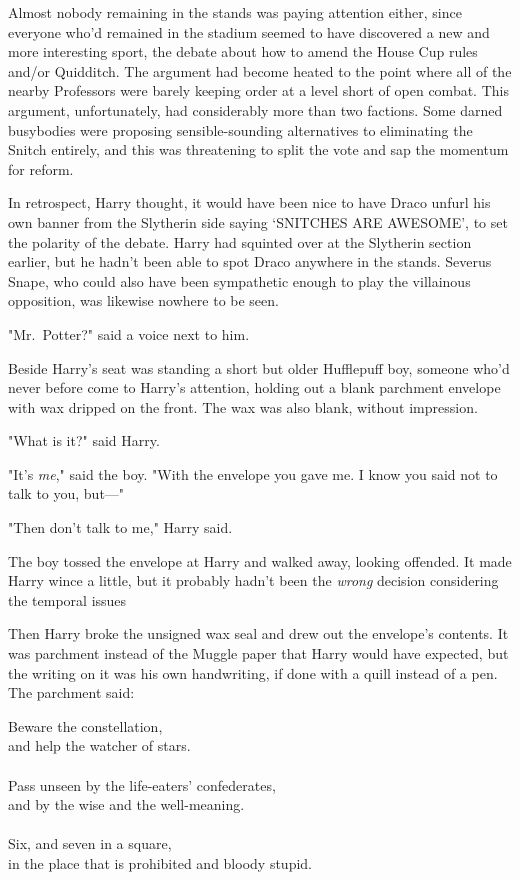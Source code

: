 Almost nobody remaining in the stands was paying attention either, since
everyone who'd remained in the stadium seemed to have discovered a new and more
interesting sport, the debate about how to amend the House Cup rules and/or
Quidditch. The argument had become heated to the point where all of the nearby
Professors were barely keeping order at a level short of open combat. This
argument, unfortunately, had considerably more than two factions. Some darned
busybodies were proposing sensible-sounding alternatives to eliminating the
Snitch entirely, and this was threatening to split the vote and sap the
momentum for reform.

In retrospect, Harry thought, it would have been nice to have Draco unfurl his
own banner from the Slytherin side saying `SNITCHES ARE AWESOME', to set the
polarity of the debate. Harry had squinted over at the Slytherin section
earlier, but he hadn't been able to spot Draco anywhere in the stands. Severus
Snape, who could also have been sympathetic enough to play the villainous
opposition, was likewise nowhere to be seen.

"Mr.~Potter?" said a voice next to him.

Beside Harry's seat was standing a short but older Hufflepuff boy, someone
who'd never before come to Harry's attention, holding out a blank parchment
envelope with wax dripped on the front. The wax was also blank, without
impression.

"What is it?" said Harry.

"It's \emph{me}," said the boy. "With the envelope you gave me. I know you said
not to talk to you, but—"

"Then don't talk to me," Harry said.

The boy tossed the envelope at Harry and walked away, looking offended. It made
Harry wince a little, but it probably hadn't been the \emph{wrong} decision
considering the temporal issues{\el}

Then Harry broke the unsigned wax seal and drew out the envelope's contents. It
was parchment instead of the Muggle paper that Harry would have expected, but
the writing on it was his own handwriting, if done with a quill instead of a
pen. The parchment said:

\begin{writtenNote}
Beware the constellation,\\
and help the watcher of stars.\\
\\
Pass unseen by the life-eaters' confederates,\\
and by the wise and the well-meaning.\\
\\
Six, and seven in a square,\\
in the place that is prohibited and bloody stupid.
\end{writtenNote}

